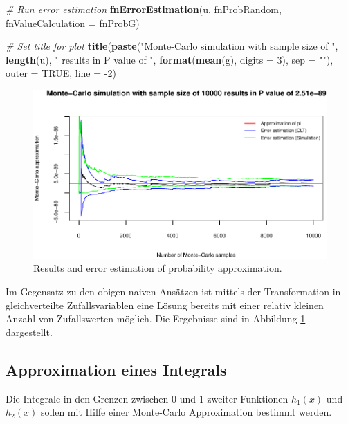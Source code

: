 \documentclass[10pt,]{article}
\newenvironment{Shaded}{\begin{snugshade}}{\end{snugshade}}
\newcommand{\KeywordTok}[1]{\textcolor[rgb]{0.13,0.29,0.53}{\textbf{{#1}}}}
\newcommand{\DataTypeTok}[1]{\textcolor[rgb]{0.13,0.29,0.53}{{#1}}}
\newcommand{\DecValTok}[1]{\textcolor[rgb]{0.00,0.00,0.81}{{#1}}}
\newcommand{\StringTok}[1]{\textcolor[rgb]{0.31,0.60,0.02}{{#1}}}
\newcommand{\CommentTok}[1]{\textcolor[rgb]{0.56,0.35,0.01}{\textit{{#1}}}}
\newcommand{\OtherTok}[1]{\textcolor[rgb]{0.56,0.35,0.01}{{#1}}}
\newcommand{\NormalTok}[1]{{#1}}
\begin{document}
\begin{Shaded}
\begin{Highlighting}[]
\CommentTok{# Run error estimation}
\KeywordTok{fnErrorEstimation}\NormalTok{(u, fnProbRandom, }\DataTypeTok{fnValueCalculation =} \NormalTok{fnProbG)}

\CommentTok{# Set title for plot}
\KeywordTok{title}\NormalTok{(}\KeywordTok{paste}\NormalTok{(}\StringTok{"Monte-Carlo simulation with sample size of "}\NormalTok{, }\KeywordTok{length}\NormalTok{(u),}
            \StringTok{" results in P value of "}\NormalTok{, }\KeywordTok{format}\NormalTok{(}\KeywordTok{mean}\NormalTok{(g), }\DataTypeTok{digits =} \DecValTok{3}\NormalTok{), }\DataTypeTok{sep =} \StringTok{""}\NormalTok{),}
      \DataTypeTok{outer =} \OtherTok{TRUE}\NormalTok{,  }\DataTypeTok{line =} \NormalTok{-}\DecValTok{2}\NormalTok{)}
\end{Highlighting}
\end{Shaded}

\begin{figure}[htbp]
\centering
\includegraphics{project1_files/figure-latex/Wahrscheinlichkeit Monte Carlo Transformation-1.pdf}
\caption{Results and error estimation of probability
approximation.\label{fig:plotP}}
\end{figure}

Im Gegensatz zu den obigen naiven Ansätzen ist mittels der
Transformation in gleichverteilte Zufallsvariablen eine Lösung bereits
mit einer relativ kleinen Anzahl von Zufallswerten möglich. Die
Ergebnisse sind in Abbildung \ref{fig:plotP} dargestellt.

\subsection{Approximation eines
Integrals}\label{approximation-eines-integrals}

Die Integrale in den Grenzen zwischen \(0\) und \(1\) zweiter Funktionen
\(h_1(x)\) und \(h_2(x)\) sollen mit Hilfe einer Monte-Carlo
Approximation bestimmt werden.
\end{document}
